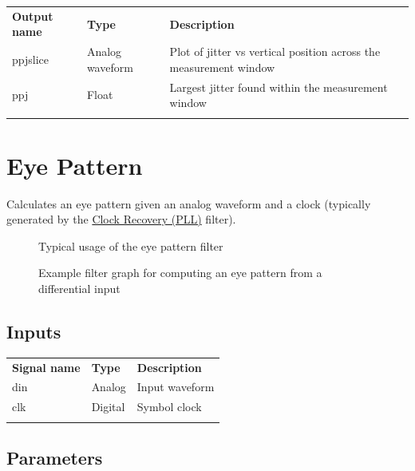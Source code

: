 \begin{tabularx}{16cm}{llX}
\thickhline
\textbf{Output name} & \textbf{Type} & \textbf{Description} \\
\thickhline
ppjslice & Analog waveform & Plot of jitter vs vertical position across the measurement window \\
\thinhline
ppj & Float & Largest jitter found within the measurement window\\
\thickhline
\end{tabularx}

\pagebreak
\section{Eye Pattern}
\label{filter:eyepattern}

Calculates an eye pattern given an analog waveform and a clock (typically generated by the
\hyperref[filter:cdrpll]{Clock Recovery (PLL)} filter).

\begin{figure}[h]
\centering
{}
\caption{Typical usage of the eye pattern filter}
\label{filter_eye}
\end{figure}

\begin{figure}[h]
\centering
{}
\caption{Example filter graph for computing an eye pattern from a differential input}
\label{filter_graph_eye}
\end{figure}
\FloatBarrier

\subsection{Inputs}

\begin{tabularx}{16cm}{llX}
\thickhline
\textbf{Signal name} & \textbf{Type} & \textbf{Description} \\
\thickhline
din & Analog & Input waveform \\
\thinhline
clk & Digital & Symbol clock \\
\thickhline
\end{tabularx}

\subsection{Parameters}

